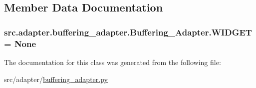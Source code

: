 \subsection{Member Data Documentation}
\hypertarget{classsrc_1_1adapter_1_1buffering__adapter_1_1Buffering__Adapter_ac7a3269ffd08f8f1dd5f93b5442b2a73}{}
\subsubsection[{W\+I\+D\+G\+E\+T}]{\setlength{\rightskip}{0pt plus 5cm}src.\+adapter.\+buffering\+\_\+adapter.\+Buffering\+\_\+\+Adapter.\+W\+I\+D\+G\+E\+T = None\hspace{0.3cm}{\ttfamily [static]}}\label{classsrc_1_1adapter_1_1buffering__adapter_1_1Buffering__Adapter_ac7a3269ffd08f8f1dd5f93b5442b2a73}


The documentation for this class was generated from the following file\+:\begin{DoxyCompactItemize}
\item 
src/adapter/\hyperlink{buffering__adapter_8py}{buffering\+\_\+adapter.\+py}\end{DoxyCompactItemize}
